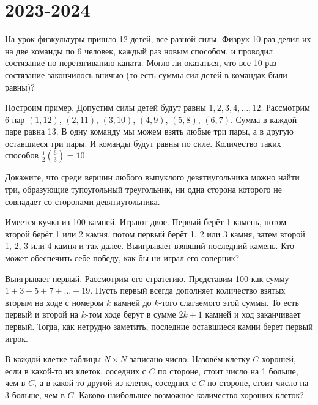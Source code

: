 \documentclass[11pt, a4paper]{template}
\begin{document}
\chapter{2023-2024}

\begin{exercise}
На урок физкультуры пришло 12 детей, все разной силы. Физрук 10 раз делил их на две команды
по 6 человек, каждый раз новым способом, и проводил состязание по перетягиванию каната.
Могло ли оказаться, что все 10 раз состязание закончилось вничью (то есть суммы сил детей в
командах были равны)?
\end{exercise}

\begin{solution}
Построим пример. Допустим силы детей будут равны $1, 2, 3, 4, \dots, 12$. Рассмотрим 6 пар $(1, 12)$, $(2, 11)$, $(3, 10)$, $(4, 9)$, $(5, 8)$, $(6, 7)$. Сумма в каждой паре равна 13. В одну команду мы можем взять любые три пары, а в другую оставшиеся три пары. И команды будут равны по силе. Количество таких способов $\frac{1}{2} \binom{6}{3} = 10$.
\end{solution}

\begin{exercise}
Докажите, что среди вершин любого выпуклого девятиугольника можно найти три, образующие
тупоугольный треугольник, ни одна сторона которого не совпадает со сторонами девятиугольника.
\end{exercise}

\begin{exercise}
Имеется кучка из 100 камней. Играют двое. Первый берёт 1 камень, потом второй берёт 1 или
2 камня, потом первый берёт 1, 2 или 3 камня, затем второй 1, 2, 3 или 4 камня и так далее.
Выигрывает взявший последний камень. Кто может обеспечить себе победу, как бы ни играл его
соперник?
\end{exercise}

\begin{solution}
Выигрывает первый. Рассмотрим его стратегию. Представим 100 как сумму $1 + 3 + 5 + 7 + \dots + 19$. Пусть первый всегда дополняет количество взятых вторым на ходе с номером $k$ камней до $k$-того слагаемого этой суммы. То есть первый и второй на $k$-том ходе берут в сумме $2k + 1$ камней и ход заканчивает первый. Тогда, как нетрудно заметить, последние оставшиеся камни берет первый игрок.
\end{solution}

\begin{exercise}
В каждой клетке таблицы $N \times N$ записано число. Назовём клетку $C$ хорошей, если в какой-то из клеток, соседних с $C$ по стороне, стоит число на 1 больше, чем в $C$, а в какой-то другой из клеток, соседних с $C$ по стороне, стоит число на 3 больше, чем в $C$. Каково наибольшее возможное количество хороших клеток?
\end{exercise}
\end{document}
